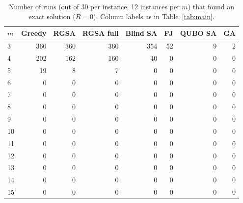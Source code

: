 \begin{table}[t]
\centering
\footnotesize
\setlength{\tabcolsep}{3pt}
\caption{Number of runs (out of 30 per instance, 12 instances per $m$) that found an exact solution ($R=0$). Column labels as in Table~\ref{tab:main}.}\label{tab:mainexact}
\begin{tabular}{lrrrrrrr}
\toprule
$m$ & Greedy & RGSA & RGSA full & Blind SA & FJ & QUBO SA & GA \\
\midrule
3 & 360 & 360 & 360 & 354 & 52 & 9 & 2 \\
4 & 202 & 162 & 160 & 40 & 0 & 0 & 0 \\
5 & 19 & 8 & 7 & 0 & 0 & 0 & 0 \\
6 & 0 & 0 & 0 & 0 & 0 & 0 & 0 \\
7 & 0 & 0 & 0 & 0 & 0 & 0 & 0 \\
8 & 0 & 0 & 0 & 0 & 0 & 0 & 0 \\
9 & 0 & 0 & 0 & 0 & 0 & 0 & 0 \\
10 & 0 & 0 & 0 & 0 & 0 & 0 & 0 \\
11 & 0 & 0 & 0 & 0 & 0 & 0 & 0 \\
12 & 0 & 0 & 0 & 0 & 0 & 0 & 0 \\
13 & 0 & 0 & 0 & 0 & 0 & 0 & 0 \\
14 & 0 & 0 & 0 & 0 & 0 & 0 & 0 \\
15 & 0 & 0 & 0 & 0 & 0 & 0 & 0 \\
\bottomrule
\end{tabular}
\end{table}
